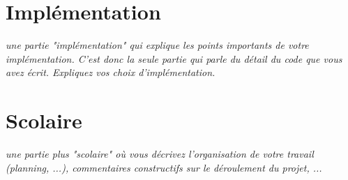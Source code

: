 \documentclass{article}
\begin{document}
\section{Implémentation}
\textit{une partie "implémentation" qui explique les points importants de votre implémentation. C'est donc la seule partie qui parle du détail du code que vous avez écrit. Expliquez vos choix d'implémentation.
}
\vspace{5mm}

\section{Scolaire}
\textit{une partie plus "scolaire" où vous décrivez l'organisation de votre travail (planning, ...), commentaires constructifs sur le déroulement du projet, ...}
\vspace{5mm}
\end{document}
